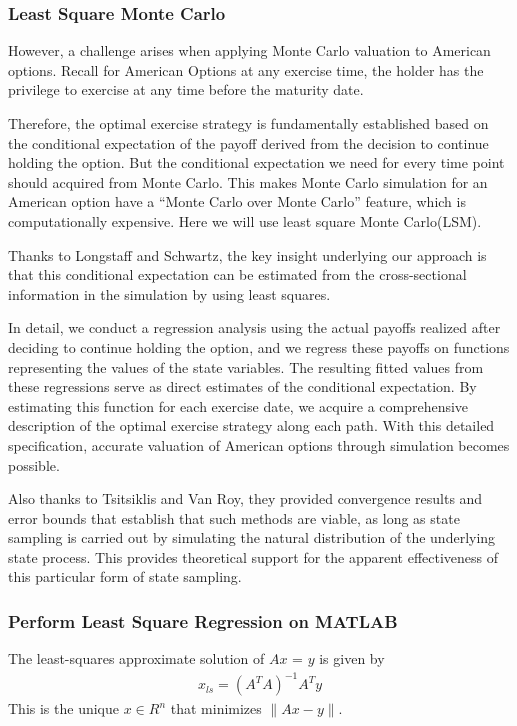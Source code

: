 \documentclass{article}
\begin{document}
\subsubsection{Least Square Monte Carlo}
However, a challenge arises when applying Monte Carlo valuation to American options. Recall for American Options at any exercise time, the holder has the privilege to exercise at any time before the maturity date. 

Therefore, the optimal exercise strategy is fundamentally established based on the conditional expectation of the payoff derived from the decision to continue holding the option. But the conditional expectation we need for every time point should acquired from Monte Carlo. This makes Monte Carlo simulation for an American option have a “Monte Carlo over Monte Carlo” feature, which is computationally expensive. Here we will use least square Monte Carlo(LSM).

Thanks to Longstaff and Schwartz, the key insight underlying our approach is that this conditional expectation can be estimated from the cross-sectional information in the simulation by using least squares.\cite{LS} 

In detail, we conduct a regression analysis using the actual payoffs realized after deciding to continue holding the option, and we regress these payoffs on functions representing the values of the state variables. The resulting fitted values from these regressions serve as direct estimates of the conditional expectation. By estimating this function for each exercise date, we acquire a comprehensive description of the optimal exercise strategy along each path. With this detailed specification, accurate valuation of American options through simulation becomes possible. 

Also thanks to Tsitsiklis and Van Roy, they provided convergence results and error bounds that establish that such methods are viable, as long as state sampling is carried out by simulating the natural distribution of the underlying state process. This provides theoretical support for the apparent effectiveness of this particular form of state sampling.\cite{TJB}

\subsubsection{Perform Least Square Regression on MATLAB}
The least-squares approximate solution of $Ax$ = $y$ is given by
\begin{align*}
    x_{ls} = (A^TA)^{-1}A^Ty
\end{align*}
This is the unique $x \in R^n$ that minimizes $\lVert Ax - y \rVert$.
\end{document}
